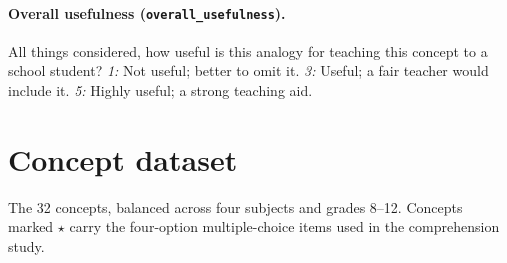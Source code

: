 \paragraph{Overall usefulness (\texttt{overall\_usefulness}).} All things considered, how useful is this analogy for teaching this concept to a school student?
\emph{1:} Not useful; better to omit it. \quad \emph{3:} Useful; a fair teacher would include it. \quad \emph{5:} Highly useful; a strong teaching aid.

\section{Concept dataset}\label{app:concepts}
The 32 concepts, balanced across four subjects and grades 8--12. Concepts marked $\star$ carry the four-option multiple-choice items used in the comprehension study.
